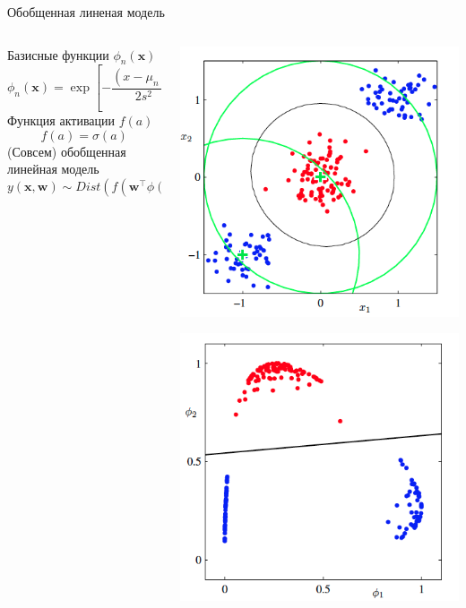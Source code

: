 \documentclass[10pt]{beamer}
\begin{document}
\begin{frame}{Обобщенная линеная модель}

\begin{columns}[T]
    \begin{column}{.5\textwidth}
    \vspace{2em}
	Базисные функции $\phi_n(\mathbf{x})$
\[
\phi_n(\mathbf{x}) = \exp\left[ -\frac{(x - \mu_n)^2}{2 s^2}\right]
\]
Функция активации $f(a)$
\[
f(a) = \sigma(a)
\]
(Совсем) обобщенная линейная модель
\[
y(\mathbf{x}, \mathbf{w}) \sim Dist\left( f(\mathbf{w}^\top \phi(\mathbf{x})) \right)
\]

    \end{column}
       
    \begin{column}{.5\textwidth}
    \vspace{-2em}
	\begin{center}
   		\includegraphics[scale=0.25]{images/nl.png}
   		
   		\includegraphics[scale=0.25]{images/l.png}
    \end{center}
    \end{column}
  \end{columns}


\end{frame}
\end{document}
